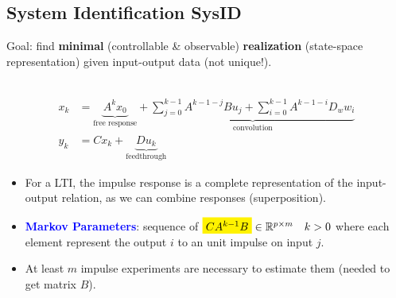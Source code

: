 \subsection{System Identification SysID}
Goal: find \textbf{minimal} (controllable \& observable) \textbf{realization} (state-space representation) given input-output data (not unique!).\\ \\
\begin{minipage}{0.43\textwidth}
    \begin{align*}
        x_k &= \underbrace{A^k x_0}_{\text{free response}} + \underbrace{\sum_{j=0}^{k-1} A^{k-1-j} B u_j + \sum_{i=0}^{k-1} A^{k-1-i} D_w w_i}_{\text{convolution}} \\
        y_k &= Cx_k + \underbrace{D u_k}_{\text{feedthrough}}
    \end{align*}
\end{minipage}
\begin{minipage}{0.53\textwidth}
    \begin{itemize}
    \item For a LTI, the impulse response is a complete representation of the input-output relation, as we can combine responses (superposition).
    \item \textcolor{blue}{\textbf{Markov Parameters}}: sequence of $\stabilo{CA^{k-1}B} \in \mathbb{R}^{p \times m} \quad k > 0$ where each element represent the output $i$ to an unit impulse on input $j$.
    \item At least $m$ impulse experiments are necessary to estimate them (needed to get matrix $B$).
    \end{itemize}
\end{minipage}


